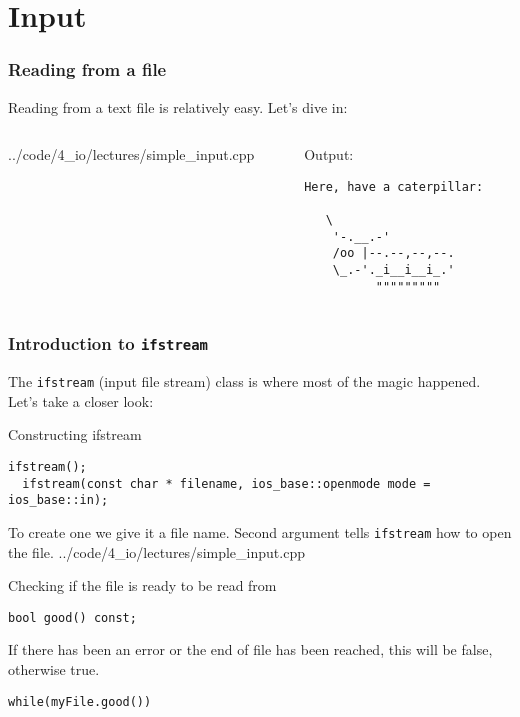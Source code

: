 \documentclass{beamer}
\begin{document}
\section{Input}

\begin{frame}[fragile]
	\frametitle{Reading from a file}
	
	Reading from a text file is relatively easy.  Let's dive in:
	\begin{columns}[t]
	  \begin{column}[T]{0.5\textwidth}
    		{../code/4_io/lectures/simple_input.cpp}
		\end{column}
		\pause
		\begin{column}[T]{0.5\textwidth}
		  Output:
			\begin{verbatim}Here, have a caterpillar:
						
   \
    '-.__.-'
    /oo |--.--,--,--.
    \_.-'._i__i__i_.'
          """""""""
		\end{verbatim}
		\end{column}
	\end{columns}
\end{frame}

\begin{frame}[fragile]
  \frametitle{Introduction to \texttt{ifstream}}
  
  The \texttt{ifstream} (input file stream) class is where most of the magic happened.  Let's take a closer look:
  \pause
  \begin{block}{Constructing ifstream}
  	\begin{lstlisting}[aboveskip=0pt]
  ifstream();
  ifstream(const char * filename, ios_base::openmode mode = ios_base::in);
		\end{lstlisting}
		To create one we give it a file name.  Second argument tells \texttt{ifstream} how to open the file.
    		{../code/4_io/lectures/simple_input.cpp}
  \end{block}
  \pause
  \begin{block}{Checking if the file is ready to be read from}
  	\begin{lstlisting}[aboveskip=0pt]
  bool good() const;
  	\end{lstlisting}
  	If there has been an error or the end of file has been reached, this will be false, otherwise true.
  	\begin{lstlisting}[belowskip=0pt]
  while(myFile.good())
  	\end{lstlisting}
  \end{block}
\end{frame}
\end{document}
